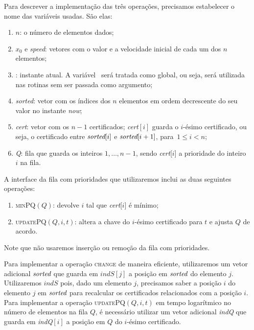 Para descrever a implementação das três operações, precisamos
estabelecer o nome das variáveis usadas.
São elas:
\begin{enumerate}
    \item $n$: o número de elementos dados;
    \item $x_0$ e \textit{speed}: vetores com o valor e a velocidade
    inicial de cada um dos $n$ elementos;
    \item \now: instante atual.
    A variável \now\ será tratada como
    global, ou seja, será utilizada nas rotinas sem ser passada como
    argumento;
    \item \textit{sorted}: vetor com os índices dos $n$ elementos em
    ordem decrescente do seu valor no instante \textit{now};
    \item \textit{cert}: vetor com os $n-1$ certificados;
    \textit{cert}$[i]$ guarda o $i$-ésimo certificado, ou seja, o certificado
    entre $\textit{sorted}[i]$ e ${\textit{sorted}[i+1]}$, para~$1\leq i < n$;
    \item \textit{Q}: fila que guarda os inteiros $1, \ldots, n-1$,
    sendo \textit{cert}[$i$] a prioridade do inteiro $i$ na fila.
\end{enumerate}



A interface da fila com prioridades que utilizaremos inclui as duas
seguintes operações:
\begin{enumerate}
    \item \textsc{minPQ}$(Q)$: devolve $i$ tal que
    \textit{cert}[$i$] é mínimo;
    \item \textsc{updatePQ}$(Q, i, t)$: altera a chave do
    $i$-ésimo certificado para $t$ e ajusta $Q$ de acordo.
\end{enumerate}

Note que não usaremos inserção ou remoção da fila com prioridades.

Para implementar a operação \textsc{change} de maneira eficiente, utilizaremos um vetor adicional
$\textit{sorted}$ que guarda em $\textit{indS}[j]$ a posição em $\textit{sorted}$ do elemento $j$.
Utilizaremos $\textit{indS}$ pois, dado um elemento $j$, precisamos saber a posição $i$ do
elemento $j$ em $\textit{sorted}$ para recalcular os certificados relacionados com a posição $i$.
Para implementar a operação \textsc{updatePQ}$(Q, i, t)$ em tempo logarítmico no número de
elementos na fila $Q$, é necessário utilizar um vetor adicional \textit{indQ} que guarda em
\textit{indQ}$[i]$ a posição em $Q$ do $i$-ésimo certificado.

